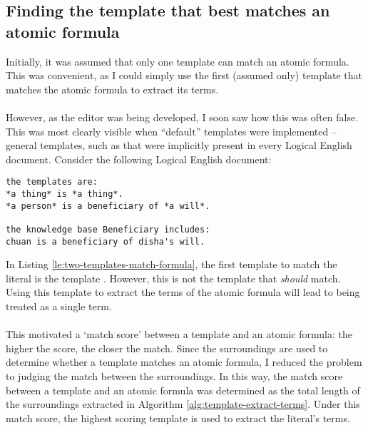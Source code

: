\documentclass[../main.tex]{subfiles}
\begin{document}
\subsection{Finding the template that best matches an atomic formula}
Initially, it was assumed that only one template can match an atomic formula. This was convenient, as I could simply use the first (assumed only) template that matches the atomic formula to extract its terms. 
\\
\\
However, as the editor was being developed, I soon saw how this was often false. This was most clearly visible when ``default'' templates were implemented -- general templates, such as  that were implicitly present in every Logical English document. Consider the following Logical English document:
\begin{lstlisting}[language={LE}, caption={A Logical English document containing two templates that both match an atomic formula.}, label={le:two-templates-match-formula}]
the templates are:
*a thing* is *a thing*.
*a person* is a beneficiary of *a will*.

the knowledge base Beneficiary includes:
chuan is a beneficiary of disha's will.
\end{lstlisting}
In Listing \ref{le:two-templates-match-formula}, the first template to match the literal  is the template . However, this is not the template that \textit{should} match. Using this template to extract the terms of the atomic formula  will lead to  being treated as a single term.
\\ 
\\
This motivated a `match score' between a template and an atomic formula: the higher the score, the closer the match. Since the surroundings are used to determine whether a template matches an atomic formula, I reduced the problem to judging the match between the surroundings. In this way, the match score between a template and an atomic formula was determined as the total length of the surroundings extracted in Algorithm \ref{alg:template-extract-terms}. Under this match score, the highest scoring template is used to extract the literal's terms.
\end{document}
